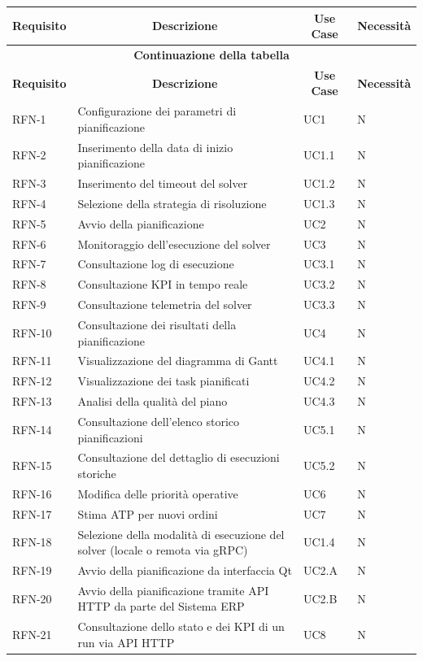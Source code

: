 \begin{center}
\begin{longtable}{|p{2.1cm}|p{6.9cm}|p{2.0cm}|p{2.0cm}|}
\hline
\multicolumn{1}{|c|}{\textbf{Requisito}} &
\multicolumn{1}{c|}{\textbf{Descrizione}} &
\multicolumn{1}{c|}{\textbf{Use Case}} &
\multicolumn{1}{c|}{\textbf{Necessità}} \\
\hline
\endfirsthead

\hline
\multicolumn{4}{c}{{\bfseries Continuazione della tabella}}\\
\hline
\multicolumn{1}{|c|}{\textbf{Requisito}} &
\multicolumn{1}{c|}{\textbf{Descrizione}} &
\multicolumn{1}{c|}{\textbf{Use Case}} &
\multicolumn{1}{c|}{\textbf{Necessità}} \\
\hline
\endhead

RFN-1  & Configurazione dei parametri di pianificazione & UC1 & N \\
\hline
RFN-2  & Inserimento della data di inizio pianificazione & UC1.1 & N \\
\hline
RFN-3  & Inserimento del timeout del solver & UC1.2 & N \\
\hline
RFN-4  & Selezione della strategia di risoluzione & UC1.3 & N \\
\hline
RFN-5  & Avvio della pianificazione & UC2 & N \\
\hline
RFN-6  & Monitoraggio dell'esecuzione del solver & UC3 & N \\
\hline
RFN-7  & Consultazione log di esecuzione & UC3.1 & N \\
\hline
RFN-8  & Consultazione KPI in tempo reale & UC3.2 & N \\
\hline
RFN-9  & Consultazione telemetria del solver & UC3.3 & N \\
\hline
RFN-10 & Consultazione dei risultati della pianificazione & UC4 & N \\
\hline
RFN-11 & Visualizzazione del diagramma di Gantt & UC4.1 & N \\
\hline
RFN-12 & Visualizzazione dei task pianificati & UC4.2 & N \\
\hline
RFN-13 & Analisi della qualità del piano & UC4.3 & N \\
\hline
RFN-14 & Consultazione dell'elenco storico pianificazioni & UC5.1 & N \\
\hline
RFN-15 & Consultazione del dettaglio di esecuzioni storiche & UC5.2 & N \\
\hline
RFN-16 & Modifica delle priorità operative & UC6 & N \\
\hline
RFN-17 & Stima ATP per nuovi ordini & UC7 & N \\
\hline
RFN-18 & Selezione della modalità di esecuzione del solver (locale o remota via gRPC) & UC1.4 & N \\
\hline
RFN-19 & Avvio della pianificazione da interfaccia Qt & UC2.A & N \\
\hline
RFN-20 & Avvio della pianificazione tramite API HTTP da parte del Sistema ERP & UC2.B & N \\
\hline
RFN-21 & Consultazione dello stato e dei KPI di un run via API HTTP & UC8 & N \\
\hline


\end{longtable}
\end{center}
